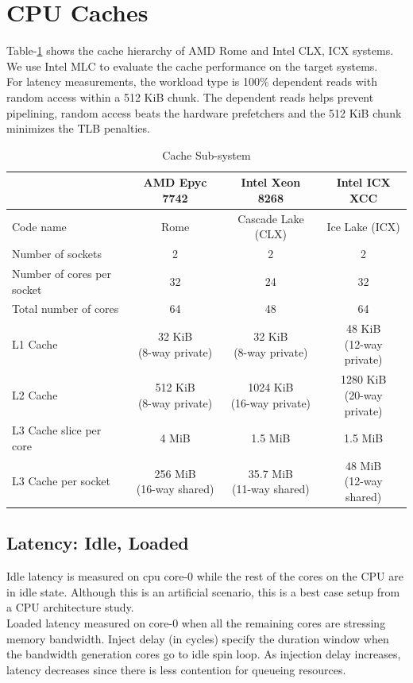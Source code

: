 \documentclass{article}
\begin{document}
\section{CPU Caches}
Table-\ref{table:cache_subsystem} shows the cache hierarchy of AMD Rome and Intel CLX, ICX systems. We use Intel MLC to evaluate the cache performance on the target systems.\\
For latency measurements, the workload type is 100\% dependent reads with random access within a 512 KiB chunk. The dependent reads helps prevent pipelining, random access beats the hardware prefetchers and the 512 KiB chunk minimizes the TLB penalties.
\begin{table}[h!]
\centering
 \begin{tabular}{|l|c|c|c|} \hline
& AMD Epyc 7742 & Intel Xeon 8268 & Intel ICX XCC \\\hline
Code name & Rome & Cascade Lake (CLX) & Ice Lake (ICX) \\ \hline
Number of sockets & 2 & 2 & 2 \\ \hline
Number of cores per socket & 32 & 24 & 32 \\ \hline
Total number of cores & 64 & 48 & 64 \\ \hline
L1 Cache & \makecell{32 KiB\\(8-way private)} & \makecell{32 KiB\\(8-way private)} & \makecell{48 KiB\\(12-way private)}\\ \hline
L2 Cache & \makecell{512 KiB\\(8-way private)} & \makecell{1024 KiB\\(16-way private)} & \makecell{1280 KiB\\(20-way private)} \\ \hline
L3 Cache slice per core & 4 MiB & 1.5 MiB & 1.5 MiB \\ \hline
L3 Cache per socket & \makecell{256 MiB\\(16-way shared)} & \makecell{35.7 MiB\\(11-way shared)} & \makecell{48 MiB\\(12-way shared)}\\ \hline
\end{tabular}
\caption{Cache Sub-system}
\label{table:cache_subsystem}
\end{table}


\subsection{Latency: Idle, Loaded}
Idle latency is measured on cpu core-0 while the rest of the cores on the CPU are in idle state. Although this is an artificial scenario, this is a best case setup from a CPU architecture study. \\
Loaded latency measured on core-0 when all the remaining cores are stressing memory bandwidth. Inject delay (in cycles) specify the duration window when the bandwidth generation cores go to idle spin loop. As injection delay increases, latency decreases since there is less contention for queueing resources. 
\end{document}
